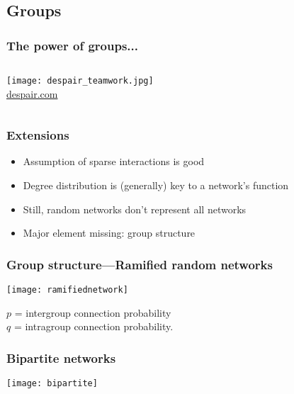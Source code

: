 \subsection{Groups}

\begin{frame}
  \frametitle{The power of groups...}
  
 \begin{columns}
   \texttt{[image: despair\_teamwork.jpg]}\\
   {\tiny \url{despair.com}}
 \end{columns}

\end{frame}

\begin{frame}
  \frametitle{Extensions}

  \begin{block}{}
    \begin{itemize}
    \item<1-> 
      Assumption of sparse interactions is good
    \item<2-> 
      Degree distribution is (generally) key to a network's function
    \item<3-> 
      Still, random networks don't represent all networks
    \item<4-> 
      Major element missing: \alert{group structure}
    \end{itemize}
  \end{block}

\end{frame}

\begin{frame}
  \frametitle{Group structure---Ramified random networks}

  \begin{block}{}
    \centering
    \texttt{[image: ramifiednetwork]}
    
    $p$ = intergroup connection probability\\
    $q$ = intragroup connection probability.
  \end{block}
 
\end{frame}

\begin{frame}
  \frametitle{Bipartite networks}
 
   \centering
   \texttt{[image: bipartite]}
 
 
 
 
 
\end{frame}

